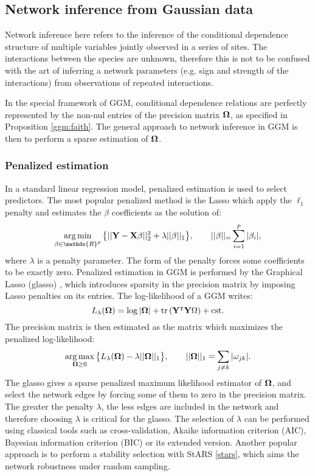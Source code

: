 \subsection{Network inference from Gaussian data}
  Network inference here refers to the inference of the conditional dependence structure of multiple variables jointly observed in a series of sites. The interactions between the species are unknown, therefore this is not to be confused with the art of inferring a network parameters (e.g. sign and strength of the interactions) from observations of repeated interactions.
  
In the special framework of GGM, conditional dependence relations are perfectly represented by the non-nul entries of the precision matrix ${\boldsymbol{\Omega}}$, as specified in Proposition \ref{ggm:faith}. The general approach to network inference in GGM is then to perform a sparse estimation of ${\boldsymbol{\Omega}}$.

 \subsubsection{Penalized estimation}
 In a standard linear regression model, penalized estimation is used to select predictors. The most popular penalized method is the Lasso \citep{lasso} which apply the $\ell_1$ penalty and estimates the $\beta$ coefficients as the solution of:
 $$\argmin_{\beta \in \mathds{R}^p} \big\{ ||\Yb - \Xb\beta ||^2_2 + \lambda ||\beta||_1\big\}, \qquad ||\beta||_=\sum_{i=1}^p |\beta_i|,$$
 where $\lambda$ is a penalty parameter. The form of the penalty forces some coefficients to be exactly zero. Penalized estimation in GGM is performed by the Graphical Lasso (glasso) \citep{glasso}, which introduces sparsity in the precision matrix by imposing Lasso penalties on its entries. The log-likelihood of a GGM writes:
 $$L_\lambda({\boldsymbol{\Omega}}) = \log |{\boldsymbol{\Omega}}| +\rm tr\left( {\bf Y}^\intercal {\bf Y} {\boldsymbol{\Omega}} \right)+cst .$$
 The precision matrix is then estimated as the matrix which maximizes the penalized log-likelihood:
 $$\operatorname*{arg\,max}_{{\boldsymbol{\Omega}}\geq 0} \big\{L_\lambda({\boldsymbol{\Omega}}) - \lambda ||{\boldsymbol{\Omega}}||_1\big\}, \qquad ||{\boldsymbol{\Omega}}||_1 = \sum_{j\neq k} |\omega_{jk}|.$$
The glasso gives a sparse penalized maximum likelihood estimator of ${\boldsymbol{\Omega}}$, and select the network edges by forcing some of them to zero in the precision matrix. The greater the penalty $\lambda$, the less edges are included in the network and therefore choosing $\lambda$ is critical for the glasso. The selection of $\lambda$ can be performed using classical tools such as cross-validation, Akaike information criterion (AIC),  Bayesian information criterion (BIC) or its extended version.  Another popular approach is to perform a stability selection with StARS \ref{stars}, which aims the network robustness under random sampling.

